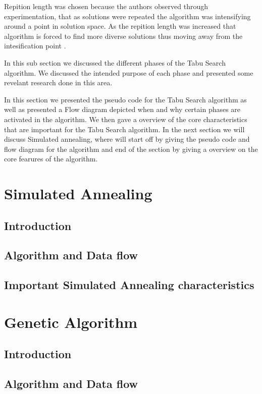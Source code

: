 Repition length was chosen because the authors observed through experimentation, that as solutions were repeated the algorithm was intensifying around a point in solution space. As the repition length was increased that algorithm is forced to find more diverse solutions thus moving away from the intesification point \cite{SelfControllingReactiveTabu}.

In this sub section we discussed the different phases of the Tabu Search algorithm. We discussed the intended purpose of each phase and presented some revelant research done in this area.

In this section we presented the pseudo code for the Tabu Search algorithm as well as presented a Flow diagram depicted when and why certain phases are activated in the algorithm. We then gave a overview of the core characteristics that are important for the Tabu Search algorithm. In the next section we will discuss Simulated annealing, where will start off by giving the pseudo code and flow diagram for the algorithm and end of the section by giving a overview on the core fearures of the algorithm.

\section{Simulated Annealing}
\subsection{Introduction}
\subsection{Algorithm and Data flow}

\subsection{Important Simulated Annealing characteristics}

\section{Genetic Algorithm}
\subsection{Introduction}
\subsection{Algorithm and Data flow}
